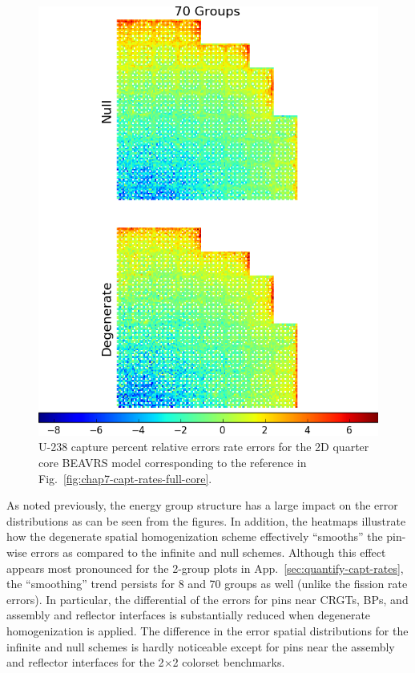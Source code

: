\begin{figure}[h!]
\centering
\includegraphics[width=\linewidth]{figures/quantification/full-core/capt-err}
\vspace{2mm}
\caption[U-238 capture rate errors for the 2D quarter core \ac{BEAVRS} model]{U-238 capture percent relative errors rate errors for the 2D quarter core \ac{BEAVRS} model corresponding to the reference in Fig.~\ref{fig:chap7-capt-rates-full-core}.}
\label{fig:chap8-full-core-capt-err}
\end{figure}

\clearpage

As noted previously, the energy group structure has a large impact on the error distributions as can be seen from the figures. In addition, the heatmaps illustrate how the degenerate spatial homogenization scheme effectively ``smooths'' the pin-wise errors as compared to the infinite and null schemes. Although this effect appears most pronounced for the 2-group plots in App.~\ref{sec:quantify-capt-rates}, the ``smoothing'' trend persists for 8 and 70 groups as well (unlike the fission rate errors). In particular, the differential of the errors for pins near \acp{CRGT}, \acp{BP}, and assembly and reflector interfaces is substantially reduced when degenerate homogenization is applied. The difference in the error spatial distributions for the infinite and null schemes is hardly noticeable except for pins near the assembly and reflector interfaces for the 2$\times$2 colorset benchmarks.

